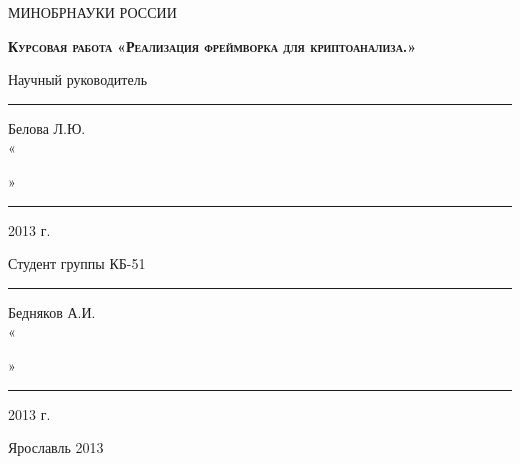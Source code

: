 \begin{titlepage}
    \begin{center}
        МИНОБРНАУКИ РОССИИ
        \linebreak

        \vspace{48pt}{
        Федеральное государственное бюджетное образовательное 
        учреждение высшего профессионального образования
        \linebreak
        «Ярославский государственный университет им. П.Г. Демидова»
        }
        \linebreak

        \vspace{1em}{
        Кафедра компьютерной безопасности и
        математических методов обработки информации
        }
    \end{center}

    \vspace{1em}

    \begin{center}
        \textsc{\textbf{Курсовая работа}}
        \linebreak
        \textsc{\textbf{«Реализация фреймворка для криптоанализа.»}}
    \end{center}

    \vspace{6em}

	\begin{flushright}
        Научный руководитель \\
        \rule{2,2cm}{1pt} Белова Л.Ю. \\
        «\rule{0,5cm}{1pt}» \rule{2,5cm}{1pt} 2013 г.

        \vspace{1.5em}

        Студент группы КБ-51 \\
        \rule{2cm}{1pt} Бедняков А.И. \\
        «\rule{0,5cm}{1pt}» \rule{2,5cm}{1pt} 2013 г.
	\end{flushright}

    \vspace{\fill}

    \begin{center}
        Ярославль 2013
    \end{center}
\end{titlepage}
